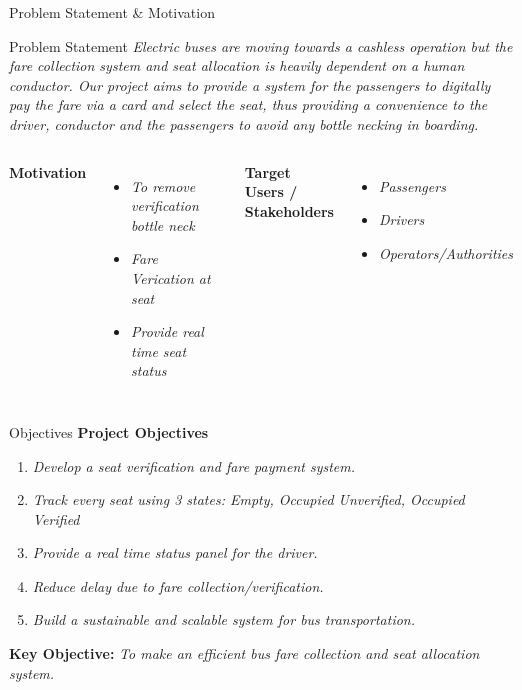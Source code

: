 \documentclass[aspectratio=169,11pt]{beamer}
\newcommand{\placeholder}[1]{\textit{\color{GEUGrey}#1}}
\begin{document}
\begin{frame}{Problem Statement \& Motivation}
\begin{block}{Problem Statement}
\placeholder{Electric buses are moving towards a cashless operation but the fare collection system and seat allocation is heavily dependent on a human conductor. Our project aims to provide a system for the passengers to digitally pay the fare via a card and select the seat, thus providing a convenience to the driver, conductor and the passengers to avoid any bottle necking in boarding.}
\end{block}
\begin{columns}[T,totalwidth=\textwidth]
\textbf{\color{GEUBlue}Motivation}
\begin{itemize}\itemsep2pt
\item \placeholder{To remove verification bottle neck}
\item \placeholder{Fare Verication at seat}
\item \placeholder{Provide  real time seat status}
\end{itemize}
\textbf{\color{GEUBlue}Target Users / Stakeholders}
\begin{itemize}\itemsep2pt
\item \placeholder{Passengers}
\item \placeholder{Drivers}
\item \placeholder{Operators/Authorities}
\end{itemize}
\end{columns}
\end{frame}

\begin{frame}{Objectives}
\textbf{\color{GEUBlue}Project Objectives}
\vspace{2mm}
\begin{enumerate}\itemsep5pt
\item \placeholder{Develop a seat verification and fare payment system.}
\item \placeholder{Track every seat using 3 states: Empty, Occupied Unverified, Occupied Verified}
\item \placeholder{Provide a real time status panel for the driver.}
\item \placeholder{Reduce delay due to fare collection/verification.}
\item \placeholder{Build a sustainable and scalable system for bus transportation.}
\end{enumerate}
\vfill
\begin{center}
\colorbox{GEULightBlue}{\parbox{.80\textwidth}{\centering
\textbf{Key Objective:} \placeholder{To make an efficient bus fare collection and seat allocation system.}}}
\end{center}
\end{frame}
\end{document}
